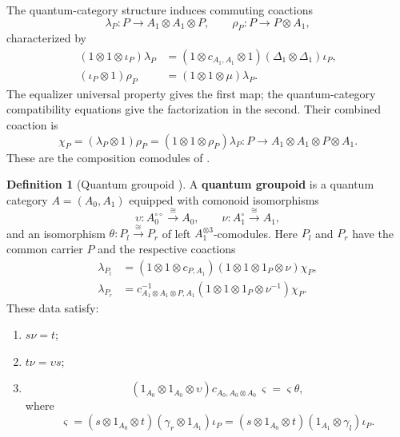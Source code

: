 \documentclass[oneside]{article}
\theoremstyle{plain}
\theoremstyle{definition}
\newtheorem{definition}[theorem]{Definition}
\theoremstyle{remark}
\begin{document}
The quantum-category structure induces commuting coactions
\[
 \lambda_P:P\longrightarrow A_1\otimes A_1\otimes P,
 \qquad \rho_P:P\longrightarrow P\otimes A_1,
\]
characterized by
\begin{align}
 (1\otimes1\otimes\iota_P)\lambda_P
   &=(1\otimes c_{A_1,A_1}\otimes1)
       (\Delta_1\otimes\Delta_1)\iota_P,
 \label{eq:cgqg-composition-left-arrow-coaction}\\
 (\iota_P\otimes1)\rho_P
   &=(1\otimes1\otimes\mu)\lambda_P.
 \label{eq:cgqg-composition-right-arrow-coaction}
\end{align}
The equalizer universal property gives the first map; the
quantum-category compatibility equations give the factorization in the
second. Their combined coaction is
\begin{equation}
 \chi_P=(\lambda_P\otimes1)\rho_P
       =(1\otimes1\otimes\rho_P)\lambda_P:
 P\longrightarrow A_1\otimes A_1\otimes P\otimes A_1.
 \label{eq:cgqg-composition-combined-coaction}
\end{equation}
These are the composition comodules of
\cite[\S\S5.1--5.3]{PastroStreet2009}.

\begin{definition}[Quantum groupoid {\cite[\S5.3]{PastroStreet2009}}]
\label{def:cgqg-background-quantum-groupoid}
    A \textbf{quantum groupoid} is a quantum category \(A=(A_0,A_1)\)
    equipped with comonoid isomorphisms
    \[
        \upsilon:A_0^{\circ\circ}\xrightarrow{\cong}A_0,
        \qquad \nu:A_1^\circ\xrightarrow{\cong}A_1,
    \]
    and an isomorphism \(\theta:P_l\xrightarrow{\cong}P_r\) of left
    \(A_1^{\otimes3}\)-comodules. Here \(P_l\) and \(P_r\) have the
    common carrier \(P\) and the respective coactions
    \begin{align}
      \lambda_{P_l}
       &=(1\otimes1\otimes c_{P,A_1})
         (1\otimes1\otimes1_P\otimes\nu)\chi_P,
       \label{eq:cgqg-groupoid-left-composition-coaction}\\
      \lambda_{P_r}
       &=c^{-1}_{A_1\otimes A_1\otimes P,A_1}
         (1\otimes1\otimes1_P\otimes\nu^{-1})\chi_P.
       \label{eq:cgqg-groupoid-right-composition-coaction}
    \end{align}
    These data satisfy:
    \begin{enumerate}[label=\textup{(G\arabic*)}]
        \item\label{ax:cgqg-G1} \(s\nu=t\);
        \item\label{ax:cgqg-G2} \(t\nu=\upsilon s\);
        \item\label{ax:cgqg-G3}
        \[
            (1_{A_0}\otimes1_{A_0}\otimes\upsilon)
            c_{A_0,A_0\otimes A_0}\,\varsigma
            =\varsigma\theta,
        \]
        where
        \[
            \varsigma
            =(s\otimes1_{A_0}\otimes t)(\gamma_r\otimes1_{A_1})\iota_P
            =(s\otimes1_{A_0}\otimes t)(1_{A_1}\otimes\gamma_l)\iota_P.
        \]
    \end{enumerate}
\end{definition}
\end{document}
